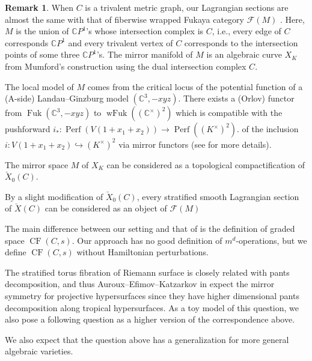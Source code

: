 \documentclass[a4paper,dvipdfmx,reqno,12pt]{amsart}
\theoremstyle{definition}
\newtheorem{remark}[theorem]{Remark}
\newcommand{\C}{\mathbb{C}}%
\newcommand{\mcal}[1]{\mathcal{#1}}%
\newcommand{\opn}[1]{\operatorname{#1}}
\newcommand{\hookto}{\hookrightarrow}
\numberwithin{equation}{section}
\begin{document}
\begin{remark} \label{rmk: curve_mirror}
When $C$ is a trivalent metric graph, 
our Lagrangian sections are 
almost the same with that of fiberwise wrapped Fukaya category 
$\mcal{F}(M)$ \cite[3.1]{auroux2022lagrangian}.
Here, $M$ is the
union of $\C P^{1}$'s whose intersection complex is $C$, 
i.e., every edge of $C$ corresponds
$\C P^{1}$ and every trivalent vertex of $C$ corresponds
to the intersection points of some three $\C P^{1}$'s.
The mirror manifold of $M$ is an algebraic curve $X_K$
from Mumford's construction using the dual intersection
complex $C$.

The local model of $M$ comes from the critical locus
of the potential function of a (A-side) Landau--Ginzburg 
model $(\C^{3},-xyz)$. There exists a (Orlov) functor
from $\opn{Fuk}(\C^{3},-xyz)$ 
to $\opn{wFuk}((\C^{\times})^2)$ which is compatible
with the pushforward 
$i_*\colon \opn{Perf}(V(1+x_1+x_2))\to \opn{Perf}((K^{\times})^{2})$. 
of the inclusion $i\colon V(1+x_1+x_2)\hookto (K^{\times})^2$
via mirror functors (see \cite[2.]{auroux2022lagrangian}
for more details). 

The mirror space $M$ of $X_K$ can be considered as a 
topological compactification of $\check{X}_0(C)$.

By a slight modification of $\check{X}_0(C)$, every 
stratified smooth Lagrangian section of $\check{X}(C)$ 
can be considered as an object of $\mcal{F}(M)$

The main difference between our setting and 
that of \cite{auroux2022lagrangian} 
is the definition of graded space $\opn{CF}(C,s)$. 
Our approach has no good definition 
of $m^{d}$-operations, but we define $\opn{CF}(C,s)$ 
without Hamiltonian
perturbations.
\end{remark}

The stratified torus fibration of Riemann surface is 
closely related with pants decomposition, and thus
Auroux--Efimov--Katzarkov in \cite{auroux2022lagrangian} expect the mirror symmetry 
for projective hypersurfaces since they have higher 
dimensional pants decomposition \cite{MR2079993} along
tropical hypersurfaces.
As a toy model of this question, we also pose a 
following question as a higher version of the 
correspondence above.

We also expect that the question above has a generalization
for more general algebraic varieties.


\end{document}
